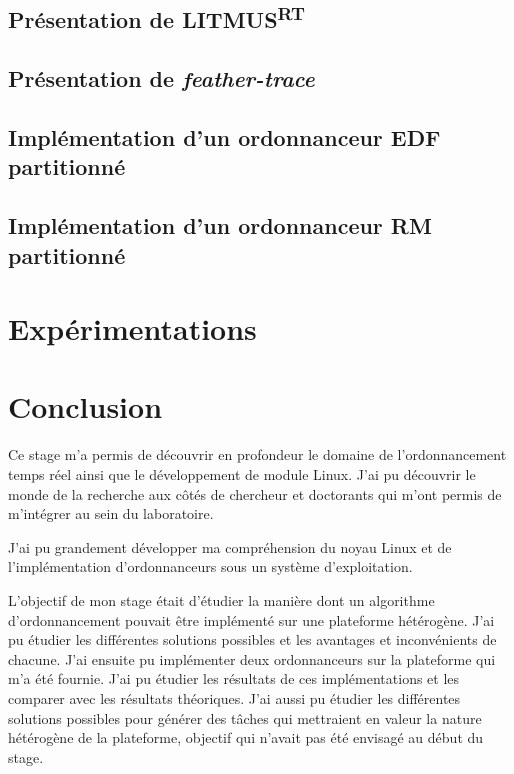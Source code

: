 \documentclass{article}
\newcommand{\litmus}{LITMUS\textsuperscript{RT}}
\begin{document}
    \subsection{Présentation de \litmus}
    
    
    
    \subsection{Présentation de \textit{feather-trace}}
    


    \subsection{Implémentation d'un ordonnanceur EDF partitionné}
    
    
    
    \subsection{Implémentation d'un ordonnanceur RM partitionné}

    
    
    
    \newpage
    \section{Expérimentations}

    


    \section{Conclusion}

    Ce stage m'a permis de découvrir en profondeur le domaine de l'ordonnancement temps réel ainsi que le développement de module Linux. J'ai pu découvrir le monde de la recherche aux côtés de chercheur et doctorants qui m'ont permis de m'intégrer au sein du laboratoire.
    
    J'ai pu grandement développer ma compréhension du noyau Linux et de l'implémentation d'ordonnanceurs sous un système d'exploitation. 

    L'objectif de mon stage était d'étudier la manière dont un algorithme d'ordonnancement pouvait être implémenté sur une plateforme hétérogène. J'ai pu étudier les différentes solutions possibles et les avantages et inconvénients de chacune. J'ai ensuite pu implémenter deux ordonnanceurs sur la plateforme qui m'a été fournie. J'ai pu étudier les résultats de ces implémentations et les comparer avec les résultats théoriques. J'ai aussi pu étudier les différentes solutions possibles pour générer des tâches qui mettraient en valeur la nature hétérogène de la plateforme, objectif qui n'avait pas été envisagé au début du stage.
\end{document}
